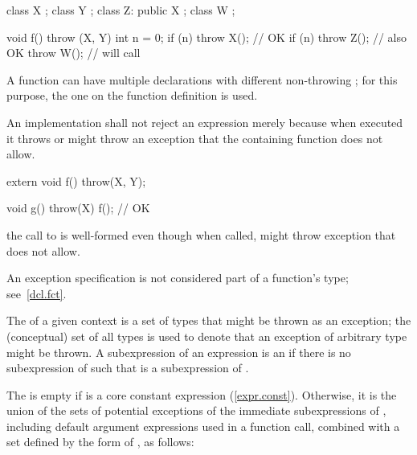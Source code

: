 \begin{example}
\begin{codeblock}
class X { };
class Y { };
class Z: public X { };
class W { };

void f() throw (X, Y) {
  int n = 0;
  if (n) throw X();             // OK
  if (n) throw Z();             // also OK
  throw W();                    // will call 
}
\end{codeblock}
\end{example}

\begin{note} A function can have multiple declarations with different non-throwing
; for this purpose, the one on the
function definition is used. \end{note}

\pnum
An implementation shall not reject an expression merely because when
executed it throws or might
throw an exception that the containing function does not allow.
\begin{example}
\begin{codeblock}
extern void f() throw(X, Y);

void g() throw(X) {
  f();                          // OK
}

\end{codeblock}
the call to
is well-formed even though when called,
might throw exception
that
does not allow.
\end{example}

\pnum
\begin{note}
An
exception specification
is not considered part of a function's type;
see~\ref{dcl.fct}.
\end{note}

\pnum
The  of a given context is
a set of types that might be thrown as an exception;
the (conceptual) set of all types is used to denote that an exception of
arbitrary type might be thrown.
A subexpression  of an expression  is an
 if there is no subexpression  of 
such that  is a subexpression of .

\pnum
The   is empty
if  is a core constant expression (\ref{expr.const}).
Otherwise, it is the union of the sets of potential exceptions of
the immediate subexpressions of ,
including default argument expressions used in a function call,
combined with a set  defined by the form of , as follows:

